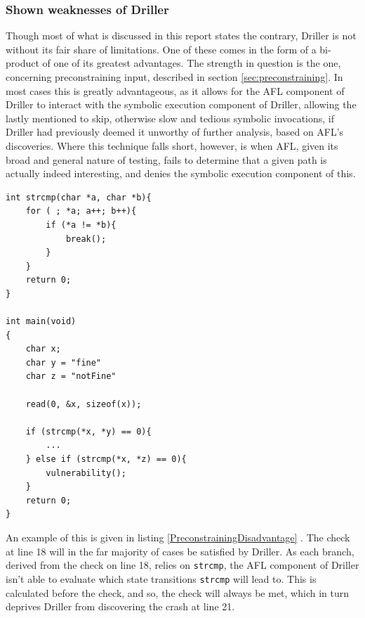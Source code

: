 \documentclass[a4paper]{article}
\newcommand{\ttt}[1]{\texttt{#1}}
\begin{document}
\subsubsection{Shown weaknesses of Driller}
\label{sec:DrillerWeaknesses}
Though most of what is discussed in this report states the contrary, Driller is not without its fair share of limitations. One of these comes in the form of a bi-product of one of its greatest advantages. The strength in question is the one, concerning preconstraining input, described in section \ref{sec:preconstraining}. In most cases this is greatly advantageous, as it allows for the AFL component of Driller to interact with the symbolic execution component of Driller, allowing the lastly mentioned to skip, otherwise slow and tedious symbolic invocations, if Driller had previously deemed it unworthy of further analysis, based on AFL's discoveries. Where this technique falls short, however, is when AFL, given its broad and general nature of testing, fails to determine that a given path is actually indeed interesting, and denies the symbolic execution component of this.
\begin{lstlisting}[caption=An example of preconstraining being a disadvantage,
label=PreconstrainingDisadvantage, captionpos=b]
int strcmp(char *a, char *b){
    for ( ; *a; a++; b++){
        if (*a != *b){
            break();
        }
    }
    return 0;
}

int main(void)
{
    char x;
    char y = "fine"
    char z = "notFine"
    
    read(0, &x, sizeof(x));
    
    if (strcmp(*x, *y) == 0){
        ...
    } else if (strcmp(*x, *z) == 0){
        vulnerability();
    }
    return 0;
}
\end{lstlisting}
An example of this is given in listing \ref{PreconstrainingDisadvantage} \cite[p.14]{Driller}. The check at line 18 will in the far majority of cases be satisfied by Driller. As each branch, derived from the check on line 18, relies on \ttt{strcmp}, the AFL component of Driller isn't able to evaluate which state transitions \ttt{strcmp} will lead to. This is calculated before the check, and so, the check will always be met, which in turn deprives Driller from discovering the crash at line 21.
\end{document}
